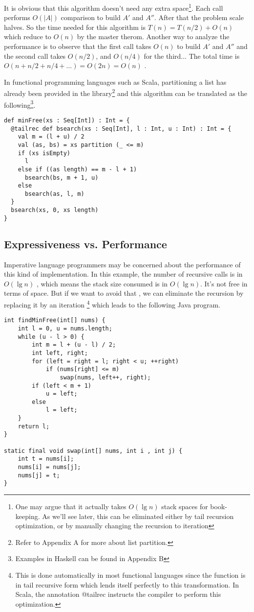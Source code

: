 \documentclass{article}
\begin{document}
It is obvious that this algorithm doesn't need any extra
space\footnote{One may argue that it
actually takes $O(\lg n)$ stack spaces for book-keeping. As
we'll see later, this can be eliminated either by tail
recursion optimization, or by manually
changing the recursion to iteration}. Each call
performs $O(|A|)$ comparison to build $A'$ and $A''$.
After that the problem scale halves.
So the time needed for this algorithm is $T(n) = T(n/2) + O(n)$
which reduce to $O(n)$ by the master therom. Another way to analyze the performance
is to observe that the first call takes $O(n)$
to build $A'$ and $A''$ and the second call takes
$O(n/2)$, and $O(n/4)$ for the third... The total
time is $O(n + n/2 + n/4 + ...) = O(2n) = O(n)$ .

In functional programming languages such as Scala,
partitioning a list has already been provided in the library\footnote{Refer to Appendix A for more about list partition.}
and this algorithm can be translated as the following\footnote{Examples in Haskell can be found in Appendix B}.

\lstset{language=Scala}
\begin{lstlisting}
def minFree(xs : Seq[Int]) : Int = {
  @tailrec def bsearch(xs : Seq[Int], l : Int, u : Int) : Int = {
    val m = (l + u) / 2
    val (as, bs) = xs partition (_ <= m)
    if (xs isEmpty)
      l
    else if ((as length) == m - l + 1)
      bsearch(bs, m + 1, u)
    else
      bsearch(as, l, m)
  }
  bsearch(xs, 0, xs length)
}
\end{lstlisting}

\subsection{Expressiveness vs. Performance}
Imperative language programmers may be concerned about the performance
of this kind of implementation. In this example, the number of recursive
calls is in $O(\lg n)$
, which means the stack size consumed is in $O(\lg n)$.
It's not free in terms of space. But if we want to avoid that
, we can eliminate the recursion by replacing it by an iteration
\footnote{This is done automatically in most functional languages
since the function is in tail recursive form which lends itself
perfectly to this transformation. In Scala, the annotation @tailrec instructs the compiler to perform this optimization.} which leads to the following Java program.

\lstset{language=Java}
\begin{lstlisting}
int findMinFree(int[] nums) {
    int l = 0, u = nums.length;
    while (u - l > 0) {
        int m = l + (u - l) / 2;
        int left, right;
        for (left = right = l; right < u; ++right)
            if (nums[right] <= m)
                swap(nums, left++, right);
        if (left < m + 1)
            u = left;
        else
            l = left;
    }
    return l;
}

static final void swap(int[] nums, int i , int j) {
    int t = nums[i];
    nums[i] = nums[j];
    nums[j] = t;
}
\end{lstlisting}
\end{document}
